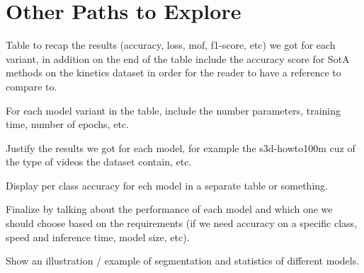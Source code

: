 \section{Other Paths to Explore}
Table to recap the results (accuracy, loss, mof, f1-score, etc) we got for each variant, in addition on the end of the table include the accuracy score for SotA methods on the kinetics dataset in order for the reader to have a reference to compare to.

For each model variant in the table, include the number parameters, training time, number of epochs, etc.

Justify the results we got for each model, for example the s3d-howto100m cuz of the type of videos the dataset contain, etc.

Display per class accuracy for ech model in a separate table or something.

Finalize by talking about the performance of each model and which one we should choose based on the requirements (if we need accuracy on a specific class, speed and inference time, model size, etc).

Show an illustration / example of segmentation and statistics of different models.